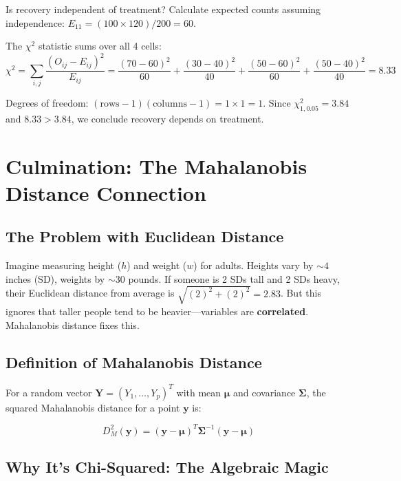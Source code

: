 \documentclass{article}
\begin{document}
Is recovery independent of treatment? Calculate expected counts assuming independence: $E_{11} = (100 \times 120)/200 = 60$.

The $\chi^2$ statistic sums over all 4 cells:
\begin{equation}
    \chi^2 = \sum_{i,j} \frac{(O_{ij} - E_{ij})^2}{E_{ij}} = \frac{(70-60)^2}{60} + \frac{(30-40)^2}{40} + \frac{(50-60)^2}{60} + \frac{(50-40)^2}{40} = 8.33
\end{equation}

Degrees of freedom: $(\text{rows}-1)(\text{columns}-1) = 1 \times 1 = 1$. Since $\chi^2_{1,0.05} = 3.84$ and $8.33 > 3.84$, we conclude recovery depends on treatment.

\section{Culmination: The Mahalanobis Distance Connection}

\subsection*{The Problem with Euclidean Distance}

Imagine measuring height ($h$) and weight ($w$) for adults. Heights vary by $\sim 4$ inches (SD), weights by $\sim 30$ pounds. If someone is 2 SDs tall and 2 SDs heavy, their Euclidean distance from average is $\sqrt{(2)^2 + (2)^2} = 2.83$. But this ignores that taller people tend to be heavier—variables are \textbf{correlated}. Mahalanobis distance fixes this.

\subsection*{Definition of Mahalanobis Distance}

For a random vector $\mathbf{Y} = (Y_1, \dots, Y_p)^T$ with mean $\boldsymbol{\mu}$ and covariance $\boldsymbol{\Sigma}$, the squared Mahalanobis distance for a point $\mathbf{y}$ is:

\begin{equation}
    D_M^2(\mathbf{y}) = (\mathbf{y} - \boldsymbol{\mu})^T \boldsymbol{\Sigma}^{-1} (\mathbf{y} - \boldsymbol{\mu})
\end{equation}

\subsection*{Why It's Chi-Squared: The Algebraic Magic}
\end{document}
